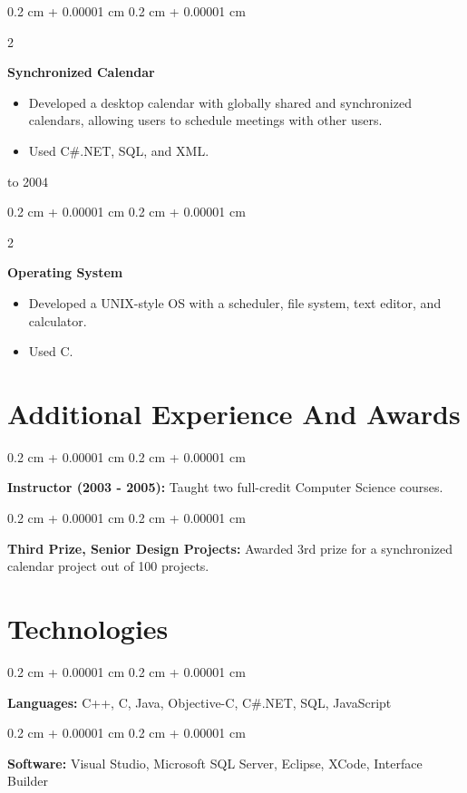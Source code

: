 \documentclass[10pt, letterpaper]{article}
\newenvironment{highlights}{
    \begin{itemize}[
        topsep=0.10 cm,
        parsep=0.10 cm,
        partopsep=0pt,
        itemsep=0pt,
        leftmargin=0.4 cm + 10pt
    ]
    }{
    \end{itemize}
} %
\newenvironment{onecolentry}{
    \begin{adjustwidth}{
        0.2 cm + 0.00001 cm
    }{
        0.2 cm + 0.00001 cm
    }
    }{
    \end{adjustwidth}
} %
\newenvironment{twocolentry}[2][]{
    \onecolentry
    \def\secondColumn{#2}
    \setcolumnwidth{\fill, 4.5 cm}
    \begin{paracol}{2}
    }{
        \switchcolumn \raggedleft \secondColumn
    \end{paracol}
    \endonecolentry
} %
\begin{document}
    \vspace{0.2 cm}

    \begin{twocolentry}{
        2003 to 2004
    }
        \textbf{Synchronized Calendar}
        \begin{highlights}
            \item Developed a desktop calendar with globally shared and synchronized calendars, allowing users to schedule meetings with other users.
            \item Used C\#.NET, SQL, and XML.
        \end{highlights}
    \end{twocolentry}


    \vspace{0.2 cm}

    \begin{twocolentry}{
        2002
    }
        \textbf{Operating System}
        \begin{highlights}
            \item Developed a UNIX-style OS with a scheduler, file system, text editor, and calculator.
            \item Used C.
        \end{highlights}
    \end{twocolentry}




    \section{Additional Experience And Awards}




    \begin{onecolentry}
        \textbf{Instructor (2003 - 2005):} Taught two full-credit Computer Science courses.
    \end{onecolentry}

    \vspace{0.2 cm}

    \begin{onecolentry}
        \textbf{Third Prize, Senior Design Projects:} Awarded 3rd prize for a synchronized calendar project out of 100 projects.
    \end{onecolentry}



    \section{Technologies}




    \begin{onecolentry}
        \textbf{Languages:} C++, C, Java, Objective-C, C\#.NET, SQL, JavaScript
    \end{onecolentry}

    \vspace{0.2 cm}

    \begin{onecolentry}
        \textbf{Software:} Visual Studio, Microsoft SQL Server, Eclipse, XCode, Interface Builder
    \end{onecolentry}
\end{document}
